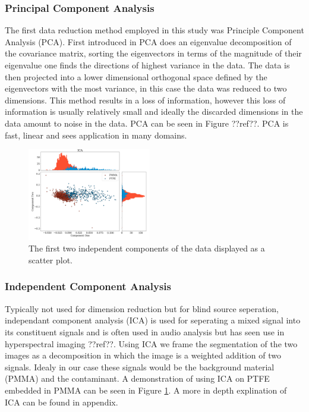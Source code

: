 \documentclass[a4paper,11pt]{article}
\begin{document}
\subsubsection{Principal Component Analysis}

The first data reduction method employed in this study was Principle Component Analysis (PCA). First introduced in PCA does an eigenvalue decomposition of the covariance matrix, sorting the eigenvectors in terms of the magnitude of their eigenvalue one finds the directions of highest variance in the data. The data is then projected into a lower dimensional orthogonal space defined by the eigenvectors with the most variance, in this case the data was reduced to two dimensions. This method results in a loss of information, however this loss of information is usually relatively small and ideally the discarded dimensions in the data amount to noise in the data. PCA can be seen in Figure ??ref??. PCA is fast, linear and sees application in many domains.

\begin{figure}
  \vspace{-20pt}
  \begin{center}
    \includegraphics[width=0.48\textwidth]{figures/ICAnone.png}
  \end{center}
  \vspace{-20pt}
  \caption{The first two independent components of the data displayed as a scatter plot.}
  \vspace{-10pt}
  \label{ICA}
\end{figure}

\subsubsection{Independent Component Analysis}

Typically not used for dimension reduction but for blind source seperation, independant component analysis (ICA) is used for seperating a mixed signal into its constituent signals and is often used in audio analysis but has seen use in hyperspectral imaging ??ref??. Using ICA we frame the segmentation of the two images as a decomposition in which the image is a weighted addition of two signals. Idealy in our case these signals would be the background material (PMMA) and the contaminant. A demonstration of using ICA on PTFE embedded in PMMA can be seen in Figure \ref{ICA}. A more in depth explination of ICA can be found in appendix.
\end{document}
